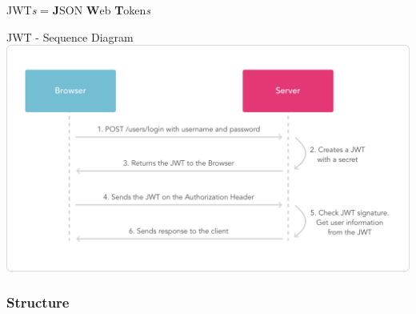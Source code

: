 \begin{frame}[allowframebreaks]
\begin{block}{JWT\emph{s} = \textbf{J}SON \textbf{W}eb \textbf{T}oken\emph{s}}
	\end{block}
	
	\begin{block}{JWT - Sequence Diagram}
		\includegraphics[width=\textwidth]{img/jwt-diagram.png}
	\end{block}
	
\end{frame}

\subsubsection{Structure}

